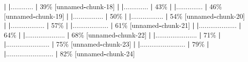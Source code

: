 \documentclass[
]{book}
\newenvironment{Shaded}{\begin{snugshade}}{\end{snugshade}}
\newcommand{\DecValTok}[1]{\textcolor[rgb]{0.00,0.00,0.81}{#1}}
\newcommand{\ErrorTok}[1]{\textcolor[rgb]{0.64,0.00,0.00}{\textbf{#1}}}
\newcommand{\NormalTok}[1]{#1}
\newcommand{\SpecialCharTok}[1]{\textcolor[rgb]{0.81,0.36,0.00}{\textbf{#1}}}
\begin{document}
\begin{Shaded}
\begin{Highlighting}[]
  \SpecialCharTok{|}                                     
  \ErrorTok{|}\NormalTok{............                   }\SpecialCharTok{|}  \DecValTok{39}\NormalTok{\% [unnamed}\SpecialCharTok{{-}}\NormalTok{chunk}\DecValTok{{-}18}\NormalTok{]}
  \SpecialCharTok{|}                                     
  \ErrorTok{|}\NormalTok{.............                  }\SpecialCharTok{|}  \DecValTok{43}\NormalTok{\%                   }
  \SpecialCharTok{|}                                     
  \ErrorTok{|}\NormalTok{..............                 }\SpecialCharTok{|}  \DecValTok{46}\NormalTok{\% [unnamed}\SpecialCharTok{{-}}\NormalTok{chunk}\DecValTok{{-}19}\NormalTok{]}
  \SpecialCharTok{|}                                     
  \ErrorTok{|}\NormalTok{................               }\SpecialCharTok{|}  \DecValTok{50}\NormalTok{\%                   }
  \SpecialCharTok{|}                                     
  \ErrorTok{|}\NormalTok{.................              }\SpecialCharTok{|}  \DecValTok{54}\NormalTok{\% [unnamed}\SpecialCharTok{{-}}\NormalTok{chunk}\DecValTok{{-}20}\NormalTok{]}
  \SpecialCharTok{|}                                     
  \ErrorTok{|}\NormalTok{..................             }\SpecialCharTok{|}  \DecValTok{57}\NormalTok{\%                   }
  \SpecialCharTok{|}                                     
  \ErrorTok{|}\NormalTok{...................            }\SpecialCharTok{|}  \DecValTok{61}\NormalTok{\% [unnamed}\SpecialCharTok{{-}}\NormalTok{chunk}\DecValTok{{-}21}\NormalTok{]}
  \SpecialCharTok{|}                                     
  \ErrorTok{|}\NormalTok{....................           }\SpecialCharTok{|}  \DecValTok{64}\NormalTok{\%                   }
  \SpecialCharTok{|}                                     
  \ErrorTok{|}\NormalTok{.....................          }\SpecialCharTok{|}  \DecValTok{68}\NormalTok{\% [unnamed}\SpecialCharTok{{-}}\NormalTok{chunk}\DecValTok{{-}22}\NormalTok{]}
  \SpecialCharTok{|}                                     
  \ErrorTok{|}\NormalTok{......................         }\SpecialCharTok{|}  \DecValTok{71}\NormalTok{\%                   }
  \SpecialCharTok{|}                                     
  \ErrorTok{|}\NormalTok{.......................        }\SpecialCharTok{|}  \DecValTok{75}\NormalTok{\% [unnamed}\SpecialCharTok{{-}}\NormalTok{chunk}\DecValTok{{-}23}\NormalTok{]}
  \SpecialCharTok{|}                                     
  \ErrorTok{|}\NormalTok{........................       }\SpecialCharTok{|}  \DecValTok{79}\NormalTok{\%                   }
  \SpecialCharTok{|}                                     
  \ErrorTok{|}\NormalTok{.........................      }\SpecialCharTok{|}  \DecValTok{82}\NormalTok{\% [unnamed}\SpecialCharTok{{-}}\NormalTok{chunk}\DecValTok{{-}24}\NormalTok{]}

\end{Highlighting}
\end{Shaded}
\end{document}
